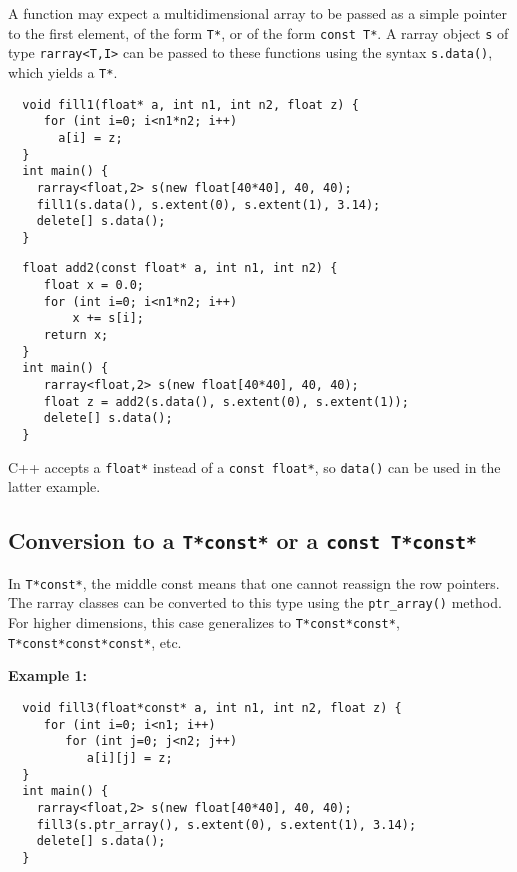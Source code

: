 \documentclass[12pt,twoside]{article}
\begin{document}
A function may expect a multidimensional array to be passed as a
simple pointer to the first element, of the form \texttt{T*}, or of the form  \texttt{const T*}. A rarray object
\texttt{s} of type \texttt{rarray{\tt<}T,I{\tt>}} can be passed to these
functions using the syntax \texttt{s.data()}, which yields a
\texttt{T*}.

\begin{framed}\vspace{-9pt}%
\begin{verbatim}
  void fill1(float* a, int n1, int n2, float z) {
     for (int i=0; i<n1*n2; i++)
       a[i] = z;
  }
  int main() {
    rarray<float,2> s(new float[40*40], 40, 40);
    fill1(s.data(), s.extent(0), s.extent(1), 3.14);
    delete[] s.data();
  }
\end{verbatim}
\end{framed}

\vspace{-5pt}\begin{framed}\vspace{-14pt}%
\begin{verbatim}
  float add2(const float* a, int n1, int n2) {
     float x = 0.0;
     for (int i=0; i<n1*n2; i++)
         x += s[i];
     return x;
  }
  int main() {
     rarray<float,2> s(new float[40*40], 40, 40);
     float z = add2(s.data(), s.extent(0), s.extent(1));
     delete[] s.data();
  }
\end{verbatim}
\vspace{-14pt}\end{framed}\vspace{-8pt}

\noindent
C++ accepts a \texttt{float*} instead of a \texttt{const float*}, so \texttt{data()} can be used in the latter example.

\subsection{Conversion to a {\tt T*const*} or a {\tt const T*const*} }

\noindent
In \texttt{T*const*}, the middle const means that one cannot reassign the row pointers.
The rarray classes can be converted to this type using the \texttt{ptr\_array()} method. 
For higher dimensions, this case generalizes to \texttt{T*const*const*}, \texttt{T*const*const*const*}, etc.

\noindent
{\bf Example 1:}
\vspace{-5pt}\begin{framed}\vspace{-14pt}%
\begin{verbatim}
  void fill3(float*const* a, int n1, int n2, float z) {
     for (int i=0; i<n1; i++)
        for (int j=0; j<n2; j++)
           a[i][j] = z;
  }
  int main() {
    rarray<float,2> s(new float[40*40], 40, 40);
    fill3(s.ptr_array(), s.extent(0), s.extent(1), 3.14);
    delete[] s.data();
  }
\end{verbatim}
\vspace{-14pt}\end{framed}\vspace{-8pt}
\end{document}
